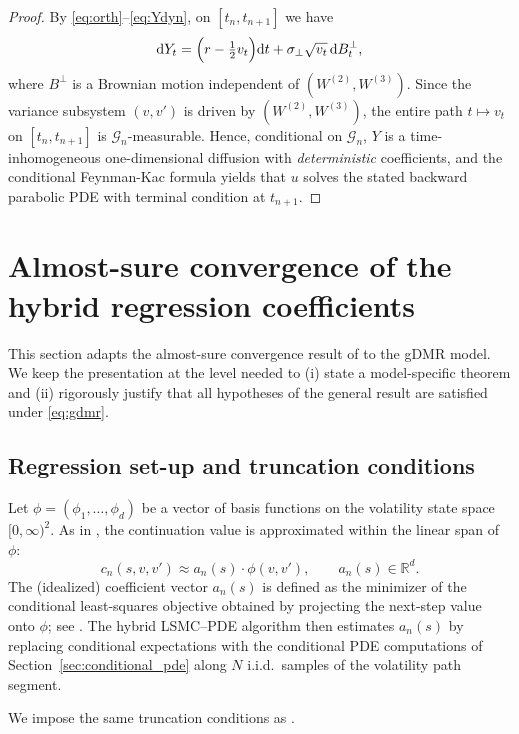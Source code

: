\documentclass[10pt]{article}
\theoremstyle{plain}
\theoremstyle{definition}
\theoremstyle{remark}
\newcommand{\dd}{\mathrm d}
\newcommand{\R}{\mathbb R}
\begin{document}
\begin{proof}
By \eqref{eq:orth}--\eqref{eq:Ydyn}, on $[t_n,t_{n+1}]$ we have
\[
\dd Y_t=\Bigl(r-\tfrac12 v_t\Bigr)\dd t+\sigma_\perp\sqrt{v_t}\,\dd B^\perp_t,
\]
where $B^\perp$ is a Brownian motion independent of $(W^{(2)},W^{(3)})$.
Since the variance subsystem $(v,v')$ is driven by $(W^{(2)},W^{(3)})$, the entire path
$t\mapsto v_t$ on $[t_n,t_{n+1}]$ is $\mathcal G_n$-measurable. Hence, conditional on $\mathcal G_n$,
$Y$ is a time-inhomogeneous one-dimensional diffusion with \emph{deterministic} coefficients, and the
conditional Feynman-Kac formula yields that $u$ solves the stated backward parabolic PDE with terminal
condition at $t_{n+1}$.
\end{proof}



\section{Almost-sure convergence of the hybrid regression coefficients}\label{sec:convergence}

This section adapts the almost-sure convergence result of \citet{farahany2020mixing} to the gDMR model.
We keep the presentation at the level needed to (i) state a model-specific theorem and (ii) rigorously justify that
all hypotheses of the general result are satisfied under \eqref{eq:gdmr}.


\subsection{Regression set-up and truncation conditions}

Let $\phi=(\phi_1,\ldots,\phi_d)$ be a vector of basis functions on the volatility state space $[0,\infty)^2$.
As in \citet{farahany2020mixing}, the continuation value is approximated within the linear span of $\phi$:
\[
c_n(s,v,v') \approx a_n(s)\cdot \phi(v,v'),\qquad a_n(s)\in\R^d.
\]
The (idealized) coefficient vector $a_n(s)$ is defined as the minimizer of the conditional least-squares objective
obtained by projecting the next-step value onto $\phi$; see \citet[Section~3.3]{farahany2020mixing}.
The hybrid LSMC--PDE algorithm then estimates $a_n(s)$ by replacing conditional expectations with the conditional PDE
computations of Section~\ref{sec:conditional_pde} along $N$ i.i.d.\ samples of the volatility path segment.

We impose the same truncation conditions as \citet{farahany2020mixing}.
\end{document}
